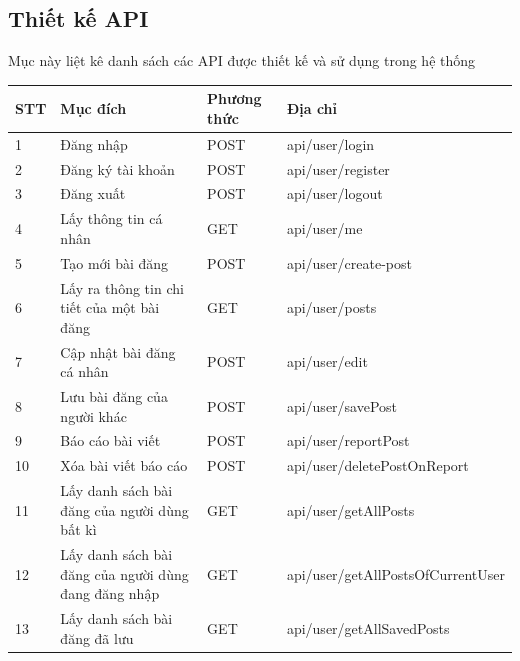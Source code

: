 \documentclass[../DoAn.tex]{subfiles}
\begin{document}
\subsection{Thiết kế API}
Mục này liệt kê danh sách các API được thiết kế và sử dụng trong hệ thống
\begin{table}[H]
\begin{tabular}{|p{1cm}|p{5.5cm}|p{1.5cm}|p{6.5cm}|}
\hline
STT & Mục đích                                             & Phương thức & Địa chỉ                           \\ \hline
1   & Đăng nhập                                            & POST        & api/user/login                    \\ \hline
2   & Đăng ký tài khoản                                    & POST        & api/user/register                 \\ \hline
3   & Đăng xuất                                            & POST        & api/user/logout                   \\ \hline
4   & Lấy thông tin cá nhân                                & GET         & api/user/me                       \\ \hline
5   & Tạo mới bài đăng                                     & POST        & api/user/create-post              \\ \hline
6   & Lấy ra thông tin chi tiết của một bài đăng           & GET         & api/user/posts                    \\ \hline
7   & Cập nhật bài đăng cá nhân                            & POST        & api/user/edit                     \\ \hline
8   & Lưu bài đăng của người khác                          & POST        & api/user/savePost                 \\ \hline
9   & Báo cáo bài viết                                     & POST        & api/user/reportPost               \\ \hline
10  & Xóa bài viết báo cáo                                 & POST        & api/user/deletePostOnReport       \\ \hline
11  & Lấy danh sách bài đăng của người dùng bất kì         & GET         & api/user/getAllPosts              \\ \hline
12  & Lấy danh sách bài đăng của người dùng đang đăng nhập & GET         & api/user/getAllPostsOfCurrentUser \\ \hline
13  & Lấy danh sách bài đăng đã lưu                        & GET         & api/user/getAllSavedPosts         \\ \hline

\end{tabular}
\end{table}
\end{document}
